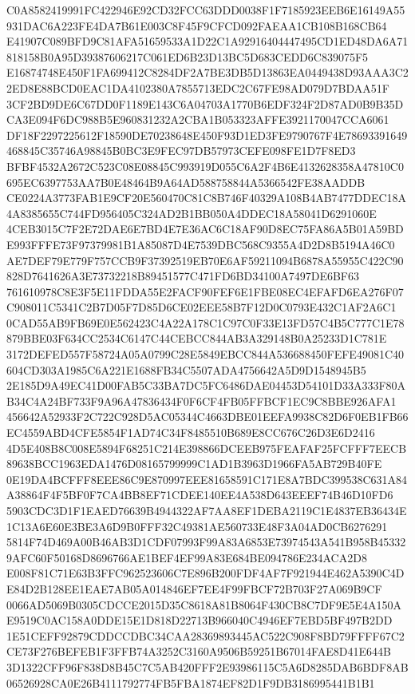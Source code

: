 \documentclass[UTF8,fontset=fandol,zihao=-4,a4paper]{ctexart}
\begin{document}
{{C0A8582419991FC422946E92CD32FCC63DDD0038F1F7185923EEB6E16149A55931DAC6A223FE4DA7B61E003C8F45F9CFCD092FAEAA1CB108B168CB64
E41907C089BFD9C81AFA51659533A1D22C1A92916404447495CD1ED48DA6A71818158B0A95D39387606217C061ED6B23D13BC5D683CEDD6C839075F5
E16874748E450F1FA699412C8284DF2A7BE3DB5D13863EA0449438D93AAA3C22ED8E88BCD0EAC1DA4102380A7855713EDC2C67FE98AD079D7BDAA51F
3CF2BD9DE6C67DD0F1189E143C6A04703A1770B6EDF324F2D87AD0B9B35DCA3E094F6DC988B5E960831232A2CBA1B053323AFFE3921170047CCA6061
DF18F2297225612F18590DE70238648E450F93D1ED3FE9790767F4E78693391649468845C35746A98845B0BC3E9FEC97DB57973CEFE098FE1D7F8ED3
BFBF4532A2672C523C08E08845C993919D055C6A2F4B6E4132628358A47810C0695EC6397753AA7B0E48464B9A64AD588758844A5366542FE38AADDB
CE0224A3773FAB1E9CF20E560470C81C8B746F40329A108B4AB7477DDEC18A4A8385655C744FD956405C324AD2B1BB050A4DDEC18A58041D6291060E
4CEB3015C7F2E72DAE6E7BD4E7E36AC6C18AF90D8EC75FA86A5B01A59BDE993FFFE73F97379981B1A85087D4E7539DBC568C9355A4D2D8B5194A46C0
AE7DEF79E779F757CCB9F37392519EB70E6AF59211094B6878A55955C422C90828D7641626A3E73732218B89451577C471FD6BD34100A7497DE6BF63
761610978C8E3F5E11FDDA55E2FACF90FEF6E1FBE08EC4EFAFD6EA276F07C908011C5341C2B7D05F7D85D6CE02EEE58B7F12D0C0793E432C1AF2A6C1
0CAD55AB9FB69E0E562423C4A22A178C1C97C0F33E13FD57C4B5C777C1E78879BBE03F634CC2534C6147C44CEBCC844AB3A329148B0A25233D1C781E
3172DEFED557F58724A05A0799C28E5849EBCC844A536688450FEFE49081C40604CD303A1985C6A221E1688FB34C5507ADA4756642A5D9D1548945B5
2E185D9A49EC41D00FAB5C33BA7DC5FC6486DAE04453D54101D33A333F80AB34C4A24BF733F9A96A47836434F0F6CF4FB05FFBCF1EC9C8BBE926AFA1
456642A52933F2C722C928D5AC05344C4663DBE01EEFA9938C82D6F0EB1FB66EC4559ABD4CFE5854F1AD74C34F8485510B689E8CC676C26D3E6D2416
4D5E408B8C008E5894F68251C214E398866DCEEB975FEAFAF25FCFFF7EECB89638BCC1963EDA1476D08165799999C1AD1B3963D1966FA5AB729B40FE
0E19DA4BCFFF8EEE86C9E870997EEE81658591C171E8A7BDC399538C631A84A38864F4F5BF0F7CA4BB8EF71CDEE140EE4A538D643EEEF74B46D10FD6
5903CDC3D1F1EAED76639B4944322AF7AA8EF1DEBA2119C1E4837EB36434E1C13A6E60E3BE3A6D9B0FFF32C49381AE560733E48F3A04AD0CB6276291
5814F74D469A00B46AB3D1CDF07993F99A83A6853E73974543A541B958B453329AFC60F50168D8696766AE1BEF4EF99A83E684BE094786E234ACA2D8
E008F81C71E63B3FFC962523606C7E896B200FDF4AF7F921944E462A5390C4DE84D2B128EE1EAE7AB05A014846EF7EE4F99FBCF72B703F27A069B9CF
0066AD5069B0305CDCCE2015D35C8618A81B8064F430CB8C7DF9E5E4A150AE9519C0AC158A0DDE15E1D818D22713B966040C4946EF7EBD5BF497B2DD
1E51CEFF92879CDDCCDBC34CAA28369893445AC522C908F8BD79FFFF67C2CE73F276BEFEB1F3FFB74A3252C3160A9506B59251B67014FAE8D41E644B
3D1322CFF96F838D8B45C7C5AB420FFF2E93986115C5A6D8285DAB6BDF8AB06526928CA0E26B4111792774FB5FBA1874EF82D1F9DB3186995441B1B1
}}
\end{document}
